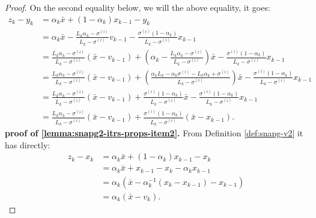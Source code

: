\documentclass[12pt]{article}
\begin{document}
\begin{proof}
        On the second equality below, we will the above equality, it goes: 
        \begin{align*}
            z_k - y_k &= 
            \alpha_k \bar x + (1 - \alpha_k)x_{k - 1} - y_k
            \\
            &= \alpha_k \bar x 
            - \frac{L_k\alpha_k - \sigma^{(i)}}{L_k - \sigma^{(i)}} v_{k - 1} 
            - \frac{\sigma^{(i)}(1 - \alpha_k)}{L_k - \sigma^{(i)}} x_{k - 1}
            \\
            &= \frac{L_k\alpha_k - \sigma^{(i)}}{L_k - \sigma^{(i)}}(\bar x - v_{k - 1})
            + \left(
                \alpha_k - \frac{L_k\alpha_k - \sigma^{(i)}}{L_k - \sigma^{(i)}}
            \right)\bar x
            - \frac{\sigma^{(i)}(1 - \alpha_k)}{L_k - \sigma^{(i)}} x_{k - 1}
            \\
            &= \frac{L_k\alpha_k - \sigma^{(i)}}{L_k - \sigma^{(i)}}(\bar x - v_{k - 1})
            + \left(
                \frac{\alpha_kL_k - \alpha_k \sigma^{(i)} - L_k\alpha_k + \sigma^{(i)}}{L_k - \sigma^{(i)}}
            \right)\bar x
            - \frac{\sigma^{(i)}(1 - \alpha_k)}{L_k - \sigma^{(i)}} x_{k - 1}
            \\
            &= \frac{L_k\alpha_k - \sigma^{(i)}}{L_k - \sigma^{(i)}}(\bar x - v_{k - 1})
            + \frac{\sigma^{(i)}(1 - \alpha_k)}{L_k - \sigma^{(i)}}\bar x
            - \frac{\sigma^{(i)}(1 - \alpha_k)}{L_k - \sigma^{(i)}} x_{k - 1}
            \\
            &= \frac{L_k\alpha_k - \sigma^{(i)}}{L_k - \sigma^{(i)}}(\bar x - v_{k - 1})
            + \frac{\sigma^{(i)}(1 - \alpha_k)}{L_k - \sigma^{(i)}}(\bar x - x_{k - 1}).
        \end{align*}
        \textbf{proof of \ref{lemma:snapg2-itrs-props-item2}.}
        From Definition \ref{def:snapg-v2} it has directly: 
        \begin{align*}
            z_k - x_k &= \alpha_k \bar x + (1 - \alpha_k)x_{k - 1} - x_k
            \\
            &= \alpha_k \bar x + x_{k - 1} - x_k - \alpha_k x_{k - 1}
            \\
            &= \alpha_k(\bar x - \alpha_k^{-1}(x_k - x_{k - 1}) - x_{k - 1})
            \\
            &= \alpha_k (\bar x - v_k).
        \end{align*}

    \end{proof}
\end{document}
